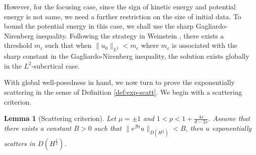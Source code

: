 \documentclass[10pt%
]{amsart}
\numberwithin{equation}{section}
\newtheorem{lemma}[theorem]{Lemma}
\theoremstyle{definition}
\begin{document}
However, for the focusing case, since the sign of kinetic energy and potential energy is not same, we need a further restriction on the size of initial data.  To bound the potential energy in this case, we shall use the sharp Gagliardo-Nirenberg inequality. Following the strategy in Weinstein \cite{Weinstein}, there exists a threshold $m_c$ such that when $\|u_0\|_{L^2}<m_c$ where $m_c$ is associated with the sharp constant in the Gagliardo-Nirenberg inequality, the solution exists globally in the $L^2$-subcrtical case. 

With global well-posedness in hand, we now turn to prove the exponentially scattering in the sense of Definition \ref{def:exp-scatt}. We begin with a scattering criterion.
\begin{lemma}[Scattering criterion] Let $\mu=\pm1$ and $1<p<1+\frac{4s}{d-2s}$. Assume that there exists a constant $B>0$ such that $\|e^{\mathcal Bt}u\|_{D(H^\frac{1}{2})}<B$, then $u$ exponentially scatters in $D(H^\frac{1}{2})$.
	
\end{lemma}
%
\end{document}

